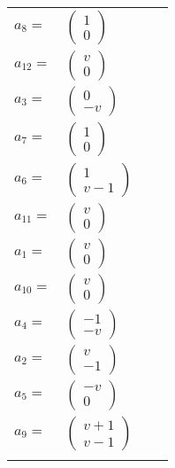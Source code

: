 \documentclass[1p]{elsarticle_modified}
\theoremstyle{definition}
\begin{document}
\begin{tabular}{m{7pt} m{180pt} m{7pt} m{180pt} }
\flushright $a_{8}=$&$\begin{pmatrix}1\\0\end{pmatrix}$ \\
\flushright $a_{12}=$&$\begin{pmatrix}v\\0\end{pmatrix}$ \\
\flushright $a_{3}=$&$\begin{pmatrix}0\\- v\end{pmatrix}$ \\
\flushright $a_{7}=$&$\begin{pmatrix}1\\0\end{pmatrix}$ \\
\flushright $a_{6}=$&$\begin{pmatrix}1\\v-1\end{pmatrix}$ \\
\flushright $a_{11}=$&$\begin{pmatrix}v\\0\end{pmatrix}$ \\
\flushright $a_{1}=$&$\begin{pmatrix}v\\0\end{pmatrix}$ \\
\flushright $a_{10}=$&$\begin{pmatrix}v\\0\end{pmatrix}$ \\
\flushright $a_{4}=$&$\begin{pmatrix}-1\\- v\end{pmatrix}$ \\
\flushright $a_{2}=$&$\begin{pmatrix}v\\-1\end{pmatrix}$ \\
\flushright $a_{5}=$&$\begin{pmatrix}- v\\0\end{pmatrix}$ \\
\flushright $a_{9}=$&$\begin{pmatrix}v+1\\v-1\end{pmatrix}$\\&\end{tabular}
\end{document}
